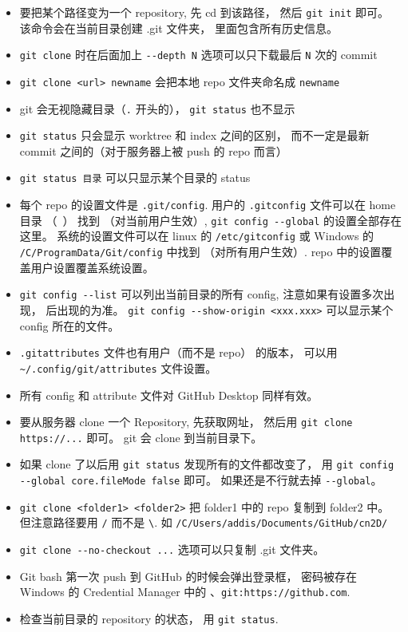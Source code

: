 \begin{itemize}
\item 要把某个路径变为一个 repository, 先 cd 到该路径， 然后 \verb|git init| 即可。 该命令会在当前目录创建 .git 文件夹， 里面包含所有历史信息。
\item \verb|git clone| 时在后面加上 \verb|--depth N| 选项可以只下载最后 \verb|N| 次的 commit
\item \verb|git clone <url> newname| 会把本地 repo 文件夹命名成 \verb|newname|
\item git 会无视隐藏目录（\verb|.| 开头的）， \verb|git status| 也不显示
\item \verb|git status| 只会显示 worktree 和 index 之间的区别， 而不一定是最新 commit 之间的（对于服务器上被 push 的 repo 而言）
\item \verb|git status 目录| 可以只显示某个目录的 status
\item 每个 repo 的设置文件是 \verb|.git/config|. 用户的 \verb|.gitconfig| 文件可以在 home 目录 （~） 找到 （对当前用户生效）, \verb|git config --global| 的设置全部存在这里。 系统的设置文件可以在 linux 的 \verb|/etc/gitconfig| 或 Windows 的 \verb|/C/ProgramData/Git/config| 中找到 （对所有用户生效）. repo 中的设置覆盖用户设置覆盖系统设置。
\item \verb|git config --list| 可以列出当前目录的所有 config, 注意如果有设置多次出现， 后出现的为准。 \verb|git config --show-origin <xxx.xxx>| 可以显示某个 config 所在的文件。
\item \verb|.gitattributes| 文件也有用户（而不是 repo） 的版本， 可以用 \verb|~/.config/git/attributes| 文件设置。
\item 所有 config 和 attribute 文件对 GitHub Desktop 同样有效。
\item 要从服务器 clone 一个 Repository, 先获取网址， 然后用 \verb|git clone https://...| 即可。 git 会 clone 到当前目录下。
\item 如果 clone 了以后用 \verb|git status| 发现所有的文件都改变了， 用 \verb|git config --global core.fileMode false| 即可。 如果还是不行就去掉 \verb|--global|。
\item \verb|git clone <folder1> <folder2>| 把 folder1 中的 repo 复制到 folder2 中。 但注意路径要用 \verb|/| 而不是 \verb|\|. 如 \verb|/C/Users/addis/Documents/GitHub/cn2D/|
\item \verb|git clone --no-checkout ...| 选项可以只复制 .git 文件夹。
\item Git bash 第一次 push 到 GitHub 的时候会弹出登录框， 密码被存在 Windows 的 Credential Manager 中的 、\verb|git:https://github.com|.
\item 检查当前目录的 repository 的状态， 用 \verb|git status|. 

\end{itemize}
